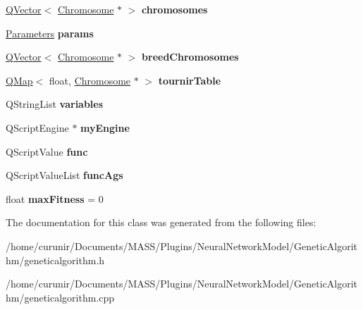 \begin{DoxyCompactItemize}
\item 
\hyperlink{class_q_vector}{Q\+Vector}$<$ \hyperlink{class_chromosome}{Chromosome} $\ast$ $>$ {\bfseries chromosomes}\hypertarget{class_genetic_algorithm_a51b416181ed5e839a55b245f02c430af}{}\label{class_genetic_algorithm_a51b416181ed5e839a55b245f02c430af}

\item 
\hyperlink{struct_genetic_algorithm_params_1_1_parameters}{Parameters} {\bfseries params}\hypertarget{class_genetic_algorithm_a08449fb8e9c0ca13f715efc46c7c3861}{}\label{class_genetic_algorithm_a08449fb8e9c0ca13f715efc46c7c3861}

\item 
\hyperlink{class_q_vector}{Q\+Vector}$<$ \hyperlink{class_chromosome}{Chromosome} $\ast$ $>$ {\bfseries breed\+Chromosomes}\hypertarget{class_genetic_algorithm_a413c9f0712074cc8dc4794b55cdadd97}{}\label{class_genetic_algorithm_a413c9f0712074cc8dc4794b55cdadd97}

\item 
\hyperlink{class_q_map}{Q\+Map}$<$ float, \hyperlink{class_chromosome}{Chromosome} $\ast$ $>$ {\bfseries tournir\+Table}\hypertarget{class_genetic_algorithm_aeb4dc5fb05dab4240068c7bb6c29362d}{}\label{class_genetic_algorithm_aeb4dc5fb05dab4240068c7bb6c29362d}

\item 
Q\+String\+List {\bfseries variables}\hypertarget{class_genetic_algorithm_aa2f60ca6342c57ff7217f678d7a02819}{}\label{class_genetic_algorithm_aa2f60ca6342c57ff7217f678d7a02819}

\item 
Q\+Script\+Engine $\ast$ {\bfseries my\+Engine}\hypertarget{class_genetic_algorithm_a732eb5d24e9f796b8f708debdf7172e1}{}\label{class_genetic_algorithm_a732eb5d24e9f796b8f708debdf7172e1}

\item 
Q\+Script\+Value {\bfseries func}\hypertarget{class_genetic_algorithm_a0c210545dc459ca999ee52783e688b53}{}\label{class_genetic_algorithm_a0c210545dc459ca999ee52783e688b53}

\item 
Q\+Script\+Value\+List {\bfseries func\+Ags}\hypertarget{class_genetic_algorithm_a744b4cccc0f9df8fdca9f573d0a5cd07}{}\label{class_genetic_algorithm_a744b4cccc0f9df8fdca9f573d0a5cd07}

\item 
float {\bfseries max\+Fitness} = 0\hypertarget{class_genetic_algorithm_a0af9a260dbff950b59184cde5cdc236f}{}\label{class_genetic_algorithm_a0af9a260dbff950b59184cde5cdc236f}

\end{DoxyCompactItemize}


The documentation for this class was generated from the following files\+:\begin{DoxyCompactItemize}
\item 
/home/curunir/\+Documents/\+M\+A\+S\+S/\+Plugins/\+Neural\+Network\+Model/\+Genetic\+Algorithm/geneticalgorithm.\+h\item 
/home/curunir/\+Documents/\+M\+A\+S\+S/\+Plugins/\+Neural\+Network\+Model/\+Genetic\+Algorithm/geneticalgorithm.\+cpp\end{DoxyCompactItemize}
